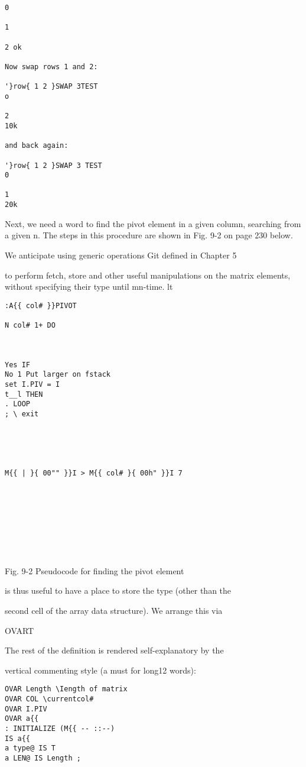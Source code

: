 {{{{{{{{{{\begin{verbatim}
0

1

2 ok

Now swap rows 1 and 2:

'}row{ 1 2 }SWAP 3TEST
o

2
10k

and back again:

'}row{ 1 2 }SWAP 3 TEST
0

1
20k

\end{verbatim} 
Next, we need a word to ﬁnd the pivot element in a given
column, searching from a given n. The steps in this procedure
are shown in Fig. 9-2 on page 230 below.

We anticipate using generic operations Git deﬁned in Chapter 5

to perform fetch, store and other useful manipulations on the
matrix elements, without specifying their type until mn-time. lt




 

\begin{verbatim}
:A{{ col# }}PIVOT

N col# 1+ DO

 

Yes IF
No 1 Put larger on fstack
set I.PIV = I
t__l THEN
. LOOP
; \ exit

 

 

M{{ | }{ 00"" }}I > M{{ col# }{ 00h" }}I 7

 

 

 

 
\end{verbatim}

Fig. 9-2 Pseudocode for finding the pivot element

is thus useful to have a place to store the type (other than the

second cell of the array data structure). We arrange this via

OVART

The rest of the deﬁnition is rendered self-explanatory by the

vertical commenting style (a must for long12 words):
\begin{verbatim}
OVAR Length \Iength of matrix
OVAR COL \currentcol#
OVAR I.PIV
OVAR a{{
: INITIALIZE (M{{ -- ::--)
IS a{{
a type@ IS T
a LEN@ IS Length ;


\end{verbatim}}}}}}}}}}}
